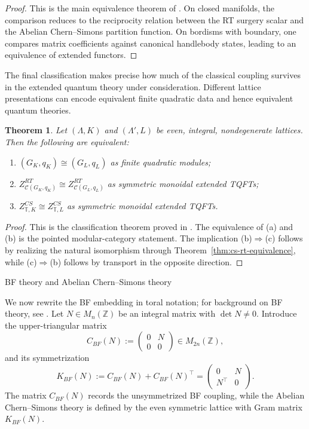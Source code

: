 \documentclass[12pt]{amsart}
\makeatletter
\renewcommand\section{\@startsection{section}{1}%
  \z@{.7\linespacing\@plus\linespacing}{.5\linespacing}%
  {\normalfont\bfseries\centering}}
\numberwithin{equation}{section}
\newtheorem{theorem}{Theorem}[section]
\theoremstyle{definition}
\makeatother
\begin{document}
\begin{proof}
This is the main equivalence theorem of \cite{Galviz3}.  On closed manifolds, the comparison reduces to the reciprocity relation between the RT surgery scalar and the Abelian Chern--Simons partition function.  On bordisms with boundary, one compares matrix coefficients against canonical handlebody states, leading to an equivalence of extended functors.
\end{proof}

The final classification makes precise how much of the classical coupling survives in the extended quantum theory under consideration. Different lattice presentations can encode equivalent finite quadratic data and hence equivalent quantum theories.

\begin{theorem}\cite[Theorem 3.2 and Corollary 3.3]{Galviz4}
\label{thm:classification}
Let $(\Lambda,K)$ and $(\Lambda',L)$ be even, integral, nondegenerate lattices. Then the following are equivalent: \begin{enumerate}[label=\rm(\alph*)] \item $(G_K,q_K)\cong (G_L,q_L)$ as finite quadratic modules; \item $Z^{RT}_{\mathcal C(G_K,q_K)}\cong Z^{RT}_{\mathcal C(G_L,q_L)}$ as symmetric monoidal extended TQFTs; \item $Z^{CS}_{\mathbb T,K}\cong Z^{CS}_{\mathbb T,L}$ as symmetric monoidal extended TQFTs.
\end{enumerate}
\end{theorem}

\begin{proof}
This is the classification theorem proved in \cite{Galviz4}.  The equivalence of \rm(a) and \rm(b) is the pointed modular-category statement.  The implication \rm(b)$\Rightarrow$\rm(c) follows by realizing the natural isomorphism through Theorem~\ref{thm:cs-rt-equivalence}, while \rm(c)$\Rightarrow$\rm(b) follows by transport in the opposite direction.
\end{proof}


\section{BF theory and Abelian Chern--Simons theory}
\label{sec:bf}

We now rewrite the BF embedding in toral notation; for background on BF theory, see \cite{Horowitz89,BlauThompson91,BBRT91}. Let $N \in M_n(\mathbb Z)$ be an integral matrix with $\det N \neq 0$. Introduce the upper-triangular matrix
$$
C_{BF}(N):=
\begin{pmatrix}
0 & N\\
0 & 0
\end{pmatrix}
\in M_{2n}(\mathbb Z),
$$
and its symmetrization
$$
K_{BF}(N):=C_{BF}(N)+C_{BF}(N)^{\top}
=
\begin{pmatrix}
0 & N\\
N^{\top} & 0
\end{pmatrix}.
$$
The matrix $C_{BF}(N)$ records the unsymmetrized BF coupling, while the Abelian Chern--Simons theory is defined by the even symmetric lattice with Gram matrix $K_{BF}(N)$.
\end{document}

